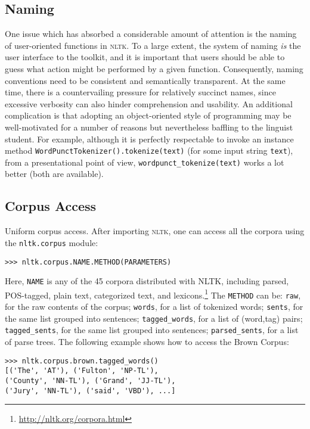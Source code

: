 \documentclass[11pt]{article}
\newcommand{\NLTK}{\textsc{nltk}}
\newcommand{\code}[1]{\texttt{\small #1}}
\begin{document}
\subsection{Naming}

One issue which has absorbed a considerable amount of attention is the
naming of user-oriented functions in \NLTK. To a large extent, the
system of naming \emph{is} the user interface to the toolkit, and it is
important that users should be able to guess what action might be
performed by a given function. Consequently, naming conventions need
to be consistent and semantically transparent. At the same time, there is a
countervailing pressure for relatively succinct names, since excessive verbosity
can also hinder comprehension and usability. An additional
complication is that adopting an object-oriented style of programming
may be well-motivated for a number of reasons but nevertheless
baffling to the linguist student. For example, although it is
perfectly respectable to invoke an instance method
\code{WordPunctTokenizer().tokenize(text)} (for some input
string \code{text}), from a presentational point of view, 
\code{wordpunct\_tokenize(text)} works a lot better
(both are available).

\subsection{Corpus Access}

Uniform corpus access.  After importing \NLTK, one can access all the corpora
using the \code{nltk.corpus} module:

{\small
\begin{verbatim}
>>> nltk.corpus.NAME.METHOD(PARAMETERS)
\end{verbatim}}

Here, \code{NAME} is any of the 45 corpora distributed with NLTK, including
parsed, POS-tagged, plain text, categorized text, and lexicons.\footnote{\url{http://nltk.org/corpora.html}}
The \code{METHOD} can be:
\code{raw}, for the raw contents of the corpus;
\code{words}, for a list of tokenized words;
\code{sents}, for the same list grouped into sentences;
\code{tagged\_words}, for a list of (word,tag) pairs;
\code{tagged\_sents}, for the same list grouped into sentences;
\code{parsed\_sents}, for a list of parse trees.
The following example shows how to access the Brown Corpus:

{\small
\begin{verbatim}
>>> nltk.corpus.brown.tagged_words()
[('The', 'AT'), ('Fulton', 'NP-TL'),
('County', 'NN-TL'), ('Grand', 'JJ-TL'),
('Jury', 'NN-TL'), ('said', 'VBD'), ...]
\end{verbatim}}
\end{document}
